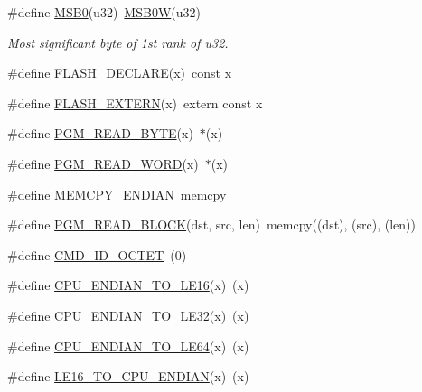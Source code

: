\begin{DoxyCompactItemize}
\#define \mbox{\hyperlink{group__group__sam0__utils_gafb81783b8186acd7182a971048b0c6b3}{M\+S\+B0}}(u32)~\mbox{\hyperlink{group__group__sam0__utils_ga25110f05bdb5b5ea3fcb2854a1a07d7a}{M\+S\+B0W}}(u32)
\begin{DoxyCompactList}\small\item\em Most significant byte of 1st rank of {\itshape u32}. \end{DoxyCompactList}\item 
\#define \mbox{\hyperlink{group__group__sam0__utils_ga9b84ecc6b34a71f797ceb8b8f7b8d384}{F\+L\+A\+S\+H\+\_\+\+D\+E\+C\+L\+A\+RE}}(x)~const x
\item 
\#define \mbox{\hyperlink{group__group__sam0__utils_gaaef0fd990bb5bd9cdf11334f7c689fd7}{F\+L\+A\+S\+H\+\_\+\+E\+X\+T\+E\+RN}}(x)~extern const x
\item 
\#define \mbox{\hyperlink{group__group__sam0__utils_gafe9b83c73d4840986478ec67d3eb7718}{P\+G\+M\+\_\+\+R\+E\+A\+D\+\_\+\+B\+Y\+TE}}(x)~$\ast$(x)
\item 
\#define \mbox{\hyperlink{group__group__sam0__utils_ga92576bffe51090dcb6d5c67e07b9eec7}{P\+G\+M\+\_\+\+R\+E\+A\+D\+\_\+\+W\+O\+RD}}(x)~$\ast$(x)
\item 
\#define \mbox{\hyperlink{group__group__sam0__utils_ga85a7d71a016789b1766f9b27d0530347}{M\+E\+M\+C\+P\+Y\+\_\+\+E\+N\+D\+I\+AN}}~memcpy
\item 
\#define \mbox{\hyperlink{group__group__sam0__utils_ga8900e4615b7d7143a6c38e2a39087538}{P\+G\+M\+\_\+\+R\+E\+A\+D\+\_\+\+B\+L\+O\+CK}}(dst,  src,  len)~memcpy((dst), (src), (len))
\item 
\#define \mbox{\hyperlink{group__group__sam0__utils_gabf2b95fa77301377cdcf79eb615551db}{C\+M\+D\+\_\+\+I\+D\+\_\+\+O\+C\+T\+ET}}~(0)
\item 
\#define \mbox{\hyperlink{group__group__sam0__utils_ga7c15ca0f3159182efc4b80a00768c2c0}{C\+P\+U\+\_\+\+E\+N\+D\+I\+A\+N\+\_\+\+T\+O\+\_\+\+L\+E16}}(x)~(x)
\item 
\#define \mbox{\hyperlink{group__group__sam0__utils_gaa2fd4bfb7af44220ce4205e2aa371017}{C\+P\+U\+\_\+\+E\+N\+D\+I\+A\+N\+\_\+\+T\+O\+\_\+\+L\+E32}}(x)~(x)
\item 
\#define \mbox{\hyperlink{group__group__sam0__utils_ga6f1e86f452c8f327f9ca96cbf6a65c81}{C\+P\+U\+\_\+\+E\+N\+D\+I\+A\+N\+\_\+\+T\+O\+\_\+\+L\+E64}}(x)~(x)
\item 
\#define \mbox{\hyperlink{group__group__sam0__utils_gaceb02fdef243c22d2559e260185fb579}{L\+E16\+\_\+\+T\+O\+\_\+\+C\+P\+U\+\_\+\+E\+N\+D\+I\+AN}}(x)~(x)
\item 

\end{DoxyCompactItemize}
